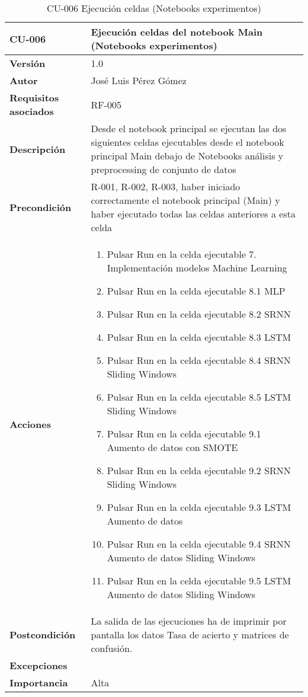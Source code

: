 \begin{table}[p]
	\centering
	\begin{tabularx}{\linewidth}{ p{} p{} }
		\toprule
		\textbf{CU-006}    & \textbf{Ejecución celdas del notebook Main (Notebooks experimentos)}\\
		\toprule
		\textbf{Versión}              & 1.0    \\
		\textbf{Autor}                & José Luis Pérez Gómez \\
		\textbf{Requisitos asociados} & RF-005 \\
		\textbf{Descripción}          & Desde el notebook principal se ejecutan las dos siguientes celdas ejecutables desde el notebook principal Main debajo de Notebooks análisis y preprocessing de conjunto de datos\\
		\textbf{Precondición}         & R-001, R-002, R-003, haber iniciado correctamente el notebook principal (Main) y haber ejecutado todas las celdas anteriores a esta celda\\
		\textbf{Acciones}             &
		\begin{enumerate}
			\def\labelenumi{\arabic{enumi}.}
			\tightlist
			\item Pulsar Run en la celda ejecutable 7. Implementación modelos Machine Learning
			\item Pulsar Run en la celda ejecutable 8.1 MLP
			\item Pulsar Run en la celda ejecutable 8.2 SRNN
			\item Pulsar Run en la celda ejecutable 8.3 LSTM
			\item Pulsar Run en la celda ejecutable 8.4 SRNN Sliding Windows
			\item Pulsar Run en la celda ejecutable 8.5 LSTM Sliding Windows
			\item Pulsar Run en la celda ejecutable 9.1 Aumento de datos con SMOTE
			\item Pulsar Run en la celda ejecutable 9.2 SRNN Sliding Windows
			\item Pulsar Run en la celda ejecutable 9.3 LSTM Aumento de datos			
			\item Pulsar Run en la celda ejecutable 9.4 SRNN Aumento de datos Sliding Windows
			\item Pulsar Run en la celda ejecutable 9.5 LSTM Aumento de datos Sliding Windows
			
		\end{enumerate}\\
		\textbf{Postcondición}        & La salida de las ejecuciones ha de imprimir por pantalla los datos Tasa de acierto y matrices de confusión.\\
		\textbf{Excepciones}          &  \\
		\textbf{Importancia}          & Alta \\
		\bottomrule
	\end{tabularx}
	\caption{CU-006 Ejecución celdas (Notebooks experimentos)}
\end{table}


